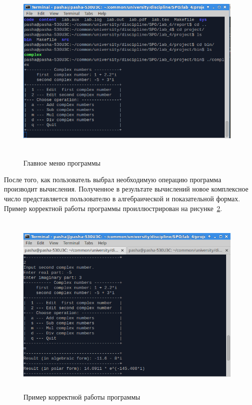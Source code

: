 \begin{figure}[htbp]
  \centering
  \includegraphics[width=150mm,height=92mm]{img/menu}
  \caption{Главное меню программы}\label{fig:menu}
\end{figure}

После того, как пользователь выбрал необходимую операцию программа производит вычисления. Полученное в результате вычислений новое комплексное число представляется пользователю в алгебраической и показательной формах. Пример корректной работы программы проиллюстрирован на рисунке~\ref{fig:correct}.

\pagebreak
\begin{figure}[h!]
  \centering
  \includegraphics[width=150mm,height=92mm]{img/correct}
  \caption{Пример корректной работы программы}\label{fig:correct}
\end{figure}

